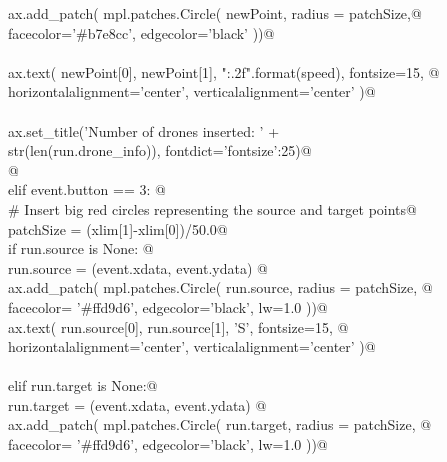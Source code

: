 \documentclass[12pt, english, oneside]{report}
\begin{document}
\begin{appendices}
\begin{flushleft}
\begin{list}{}{}
\mbox{}\verb@                 ax.add_patch( mpl.patches.Circle( newPoint, radius = patchSize,@\\
\mbox{}\verb@                                                   facecolor='#b7e8cc', edgecolor='black'  ))@\\
\mbox{}\verb@@\\
\mbox{}\verb@                 ax.text( newPoint[0], newPoint[1], "{:.2f}".format(speed), fontsize=15, @\\
\mbox{}\verb@                          horizontalalignment='center', verticalalignment='center' )@\\
\mbox{}\verb@@\\
\mbox{}\verb@                 ax.set_title('Number of drones inserted: ' +\@\\
\mbox{}\verb@                              str(len(run.drone_info)), fontdict={'fontsize':25})@\\
\mbox{}\verb@                 @\\
\mbox{}\verb@             elif event.button == 3:  @\\
\mbox{}\verb@                 # Insert big red circles representing the source and target points@\\
\mbox{}\verb@                 patchSize  = (xlim[1]-xlim[0])/50.0@\\
\mbox{}\verb@                 if run.source is None:    @\\
\mbox{}\verb@                      run.source = (event.xdata, event.ydata)  @\\
\mbox{}\verb@                      ax.add_patch( mpl.patches.Circle( run.source, radius = patchSize, @\\
\mbox{}\verb@                                                        facecolor= '#ffd9d6', edgecolor='black', lw=1.0 ))@\\
\mbox{}\verb@                      ax.text( run.source[0], run.source[1], 'S', fontsize=15, @\\
\mbox{}\verb@                               horizontalalignment='center', verticalalignment='center' )@\\
\mbox{}\verb@@\\
\mbox{}\verb@                 elif run.target is None:@\\
\mbox{}\verb@                      run.target = (event.xdata, event.ydata)  @\\
\mbox{}\verb@                      ax.add_patch( mpl.patches.Circle( run.target, radius = patchSize, @\\
\mbox{}\verb@                                                       facecolor= '#ffd9d6', edgecolor='black', lw=1.0 ))@\\

\end{list}
\end{flushleft}
\end{appendices}
\end{document}
